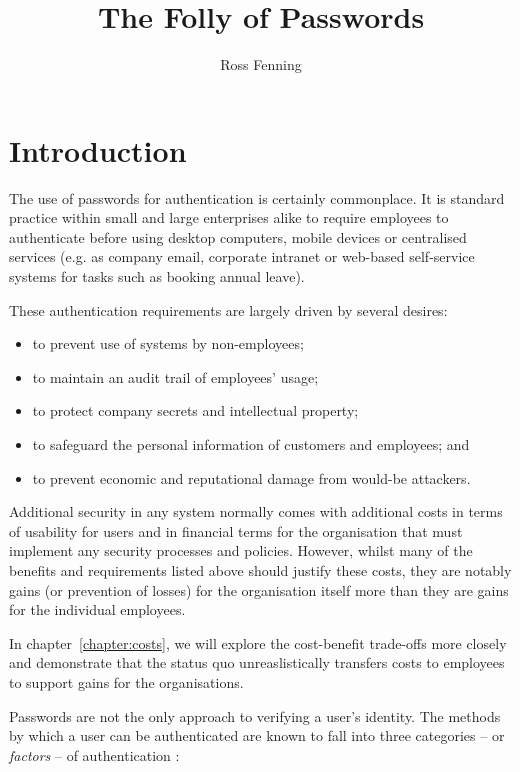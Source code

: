 \documentclass{report}
\title{The Folly of Passwords}
\author{Ross Fenning}
\begin{document}
\maketitle
\tableofcontents

\chapter{Introduction}

The use of passwords for authentication is certainly commonplace.
It is standard practice within small and large enterprises alike
to require employees to authenticate before using desktop
computers, mobile devices or centralised services (e.g.
as company email, corporate intranet or web-based self-service
systems for tasks such as booking annual leave).

These authentication requirements are largely driven by
several desires:

\begin{itemize}
  \item to prevent use of systems by non-employees;
  \item to maintain an audit trail of employees' usage;
  \item to protect company secrets and intellectual property;
  \item to safeguard the personal information of customers and employees; and
  \item to prevent economic and reputational damage from would-be attackers.
\end{itemize}

Additional security in any system normally comes with additional costs
in terms of usability for users and in financial terms for the organisation
that must implement any security processes and policies. However,
whilst many of the benefits and requirements listed above should justify
these costs, they are notably gains (or prevention of losses) for
the organisation itself more than they are gains for the individual
employees.

In chapter~\ref{chapter:costs}, we will explore the
cost-benefit trade-offs more closely and demonstrate that the status
quo unreaslistically transfers costs to employees to support gains
for the organisations.

Passwords are not the only approach to verifying a user's identity.
The methods by which a user can be authenticated are known to fall
into three categories -- or \emph{factors} -- of authentication
\parencite{council2005authentication}:
\end{document}
